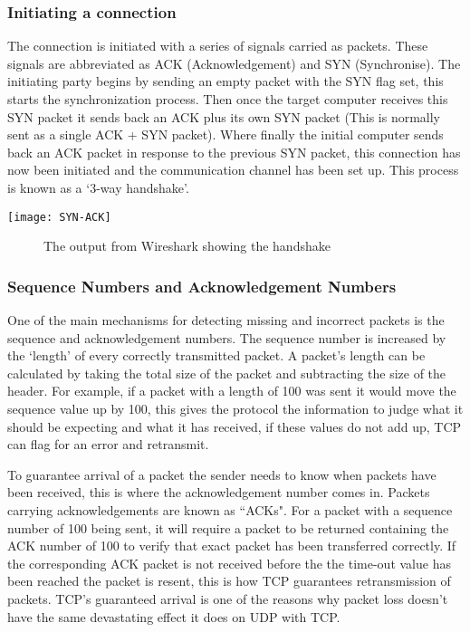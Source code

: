 \subsubsection*{Initiating a connection}
The connection is initiated with a series of signals carried as packets. These signals are abbreviated as ACK (Acknowledgement) and SYN (Synchronise). The initiating party begins by sending an empty packet with the SYN flag set, this starts the synchronization process. Then once the target computer receives this SYN packet it sends back an ACK plus its own SYN packet (This is normally sent as a single ACK + SYN packet). Where finally the initial computer sends back an ACK packet in response to the previous SYN packet, this connection has now been initiated and the communication channel has been set up. This process is known as a `3-way handshake'.

\begin{center}
	\texttt{[image: SYN-ACK]}
	\begin{figure}[h]
		\caption{The output from Wireshark showing the handshake}
	\end{figure}
\end{center}

\clearpage
\subsubsection*{Sequence Numbers and Acknowledgement Numbers}
One of the main mechanisms for detecting missing and incorrect packets is the sequence and acknowledgement numbers. The sequence number is increased by the `length' of every correctly transmitted packet. A packet's length can be calculated by taking the total size of the packet and subtracting the size of the header. For example, if a packet with a length of 100 was sent it would move the sequence value up by 100, this gives the protocol the information to judge what it should be expecting and what it has received, if these values do not add up, TCP can flag for an error and retransmit.

To guarantee arrival of a packet the sender needs to know when packets have been received, this is where the acknowledgement number comes in. Packets carrying acknowledgements are known as ``ACKs". For a packet with a sequence number of 100 being sent, it will require a packet to be returned containing the ACK number of 100 to verify that exact packet has been transferred correctly. If the corresponding ACK packet is not received before the the time-out value has been reached the packet is resent, this is how TCP guarantees retransmission of packets. TCP's guaranteed arrival is one of the reasons why packet loss doesn't have the same devastating effect it does on UDP with TCP.

